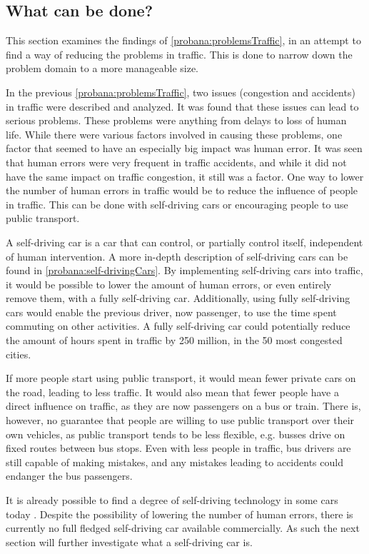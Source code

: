 \subsection{What can be done?}\label{probana:theSolution}
This section examines the findings of \autoref{probana:problemsTraffic}, in an attempt to find a way of reducing the problems in traffic.
This is done to narrow down the problem domain to a more manageable size.

In the previous \autoref{probana:problemsTraffic}, two issues (congestion and accidents) in traffic were described and analyzed.
It was found that these issues can lead to serious problems.
These problems were anything from delays to loss of human life.
While there were various factors involved in causing these problems,
one factor that seemed to have an especially big impact was human error.
It was seen that human errors were very frequent in traffic accidents, and while it did not have the same impact on traffic congestion, it still was a factor.
One way to lower the number of human errors in traffic would be to reduce the influence of people in traffic.
This can be done with self-driving cars or encouraging people to use public transport.

A self-driving car is a car that can control, or partially control itself, independent of human intervention.
A more in-depth description of self-driving cars can be found in \autoref{probana:self-drivingCars}.
By implementing self-driving cars into traffic, it would be possible to lower the amount of human errors, or even entirely remove them, with a fully self-driving car.
Additionally, using fully self-driving cars would enable the previous driver, now passenger, to use the time spent commuting on other activities.
A fully self-driving car could potentially reduce the amount of hours spent in traffic by 250 million, in the 50 most congested cities\cite{lanctot_accelerating_2017}.

If more people start using public transport, it would mean fewer private cars on the road, leading to less traffic.
It would also mean that fewer people have a direct influence on traffic, as they are now passengers on a bus or train.
There is, however, no guarantee that people are willing to use public transport over their own vehicles, as public transport tends to be less flexible, e.g. busses drive on fixed routes between bus stops.
Even with less people in traffic, bus drivers are still capable of making mistakes, and any mistakes leading to accidents could endanger the bus passengers.

It is already possible to find a degree of self-driving technology in some cars today \cite{tesla_technology}.
Despite the possibility of lowering the number of human errors, there is currently no full fledged self-driving car available commercially.
As such the next section will further investigate what a self-driving car is.
